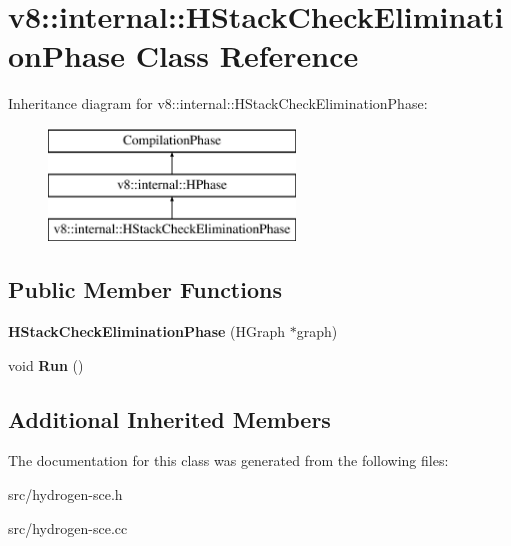 \hypertarget{classv8_1_1internal_1_1_h_stack_check_elimination_phase}{}\section{v8\+:\+:internal\+:\+:H\+Stack\+Check\+Elimination\+Phase Class Reference}
\label{classv8_1_1internal_1_1_h_stack_check_elimination_phase}
Inheritance diagram for v8\+:\+:internal\+:\+:H\+Stack\+Check\+Elimination\+Phase\+:\begin{figure}[H]
\begin{center}
\leavevmode
\includegraphics[height=3.000000cm]{classv8_1_1internal_1_1_h_stack_check_elimination_phase}
\end{center}
\end{figure}
\subsection*{Public Member Functions}
\begin{DoxyCompactItemize}
\item 
\hypertarget{classv8_1_1internal_1_1_h_stack_check_elimination_phase_a828611624c412eebc12e4c327e7f5ee2}{}{\bfseries H\+Stack\+Check\+Elimination\+Phase} (H\+Graph $\ast$graph)\label{classv8_1_1internal_1_1_h_stack_check_elimination_phase_a828611624c412eebc12e4c327e7f5ee2}

\item 
\hypertarget{classv8_1_1internal_1_1_h_stack_check_elimination_phase_a33292431e2c081975c7327b62a636c4b}{}void {\bfseries Run} ()\label{classv8_1_1internal_1_1_h_stack_check_elimination_phase_a33292431e2c081975c7327b62a636c4b}

\end{DoxyCompactItemize}
\subsection*{Additional Inherited Members}


The documentation for this class was generated from the following files\+:\begin{DoxyCompactItemize}
\item 
src/hydrogen-\/sce.\+h\item 
src/hydrogen-\/sce.\+cc\end{DoxyCompactItemize}

